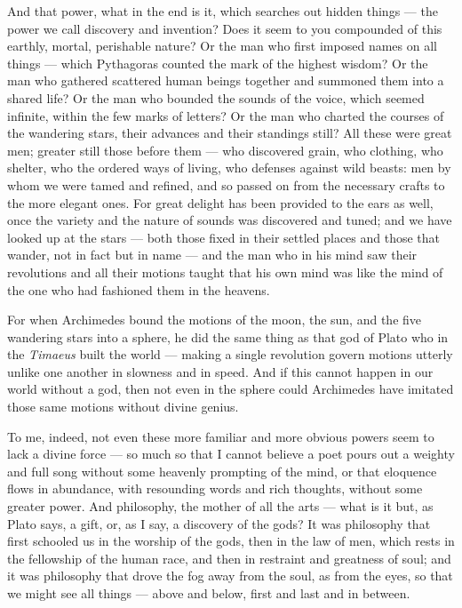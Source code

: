  And that power, what in the end is it, which searches out hidden things — the power we call discovery and invention? Does it seem to you compounded of this earthly, mortal, perishable nature? Or the man who first imposed names on all things — which Pythagoras counted the mark of the highest wisdom? Or the man who gathered scattered human beings together and summoned them into a shared life? Or the man who bounded the sounds of the voice, which seemed infinite, within the few marks of letters? Or the man who charted the courses of the wandering stars, their advances and their standings still? All these were great men; greater still those before them — who discovered grain, who clothing, who shelter, who the ordered ways of living, who defenses against wild beasts: men by whom we were tamed and refined, and so passed on from the necessary crafts to the more elegant ones. For great delight has been provided to the ears as well, once the variety and the nature of sounds was discovered and tuned; and we have looked up at the stars — both those fixed in their settled places and those that wander, not in fact but in name — and the man who in his mind saw their revolutions and all their motions taught that his own mind was like the mind of the one who had fashioned them in the heavens.

 For when Archimedes bound the motions of the moon, the sun, and the five wandering stars into a sphere, he did the same thing as that god of Plato who in the \textit{Timaeus} built the world — making a single revolution govern motions utterly unlike one another in slowness and in speed. And if this cannot happen in our world without a god, then not even in the sphere could Archimedes have imitated those same motions without divine genius.

 To me, indeed, not even these more familiar and more obvious powers seem to lack a divine force — so much so that I cannot believe a poet pours out a weighty and full song without some heavenly prompting of the mind, or that eloquence flows in abundance, with resounding words and rich thoughts, without some greater power. And philosophy, the mother of all the arts — what is it but, as Plato says, a gift, or, as I say, a discovery of the gods? It was philosophy that first schooled us in the worship of the gods, then in the law of men, which rests in the fellowship of the human race, and then in restraint and greatness of soul; and it was philosophy that drove the fog away from the soul, as from the eyes, so that we might see all things — above and below, first and last and in between.

